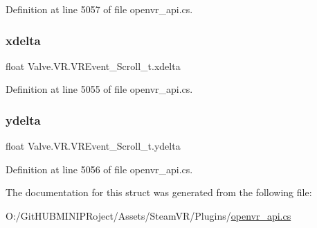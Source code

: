 Definition at line 5057 of file openvr\+\_\+api.\+cs.

\mbox{\label{struct_valve_1_1_v_r_1_1_v_r_event___scroll__t_a62b204aa0bcc818636ece59f0b5306d4}} 
\subsubsection{\texorpdfstring{xdelta}{xdelta}}
{\footnotesize\ttfamily float Valve.\+V\+R.\+V\+R\+Event\+\_\+\+Scroll\+\_\+t.\+xdelta}



Definition at line 5055 of file openvr\+\_\+api.\+cs.

\mbox{\label{struct_valve_1_1_v_r_1_1_v_r_event___scroll__t_a5009d1ab7824c8a92b626c81d9077f77}} 
\subsubsection{\texorpdfstring{ydelta}{ydelta}}
{\footnotesize\ttfamily float Valve.\+V\+R.\+V\+R\+Event\+\_\+\+Scroll\+\_\+t.\+ydelta}



Definition at line 5056 of file openvr\+\_\+api.\+cs.



The documentation for this struct was generated from the following file\+:\begin{DoxyCompactItemize}
\item 
O\+:/\+Git\+H\+U\+B\+M\+I\+N\+I\+P\+Roject/\+Assets/\+Steam\+V\+R/\+Plugins/\mbox{\hyperlink{openvr__api_8cs}{openvr\+\_\+api.\+cs}}\end{DoxyCompactItemize}
